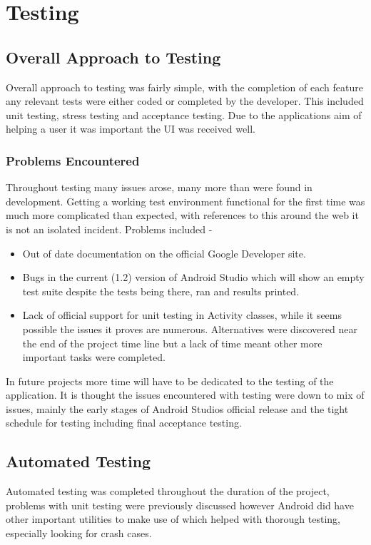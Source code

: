 \chapter{Testing}

\section{Overall Approach to Testing}
Overall approach to testing was fairly simple, with the completion of each feature any relevant tests were either coded or completed by the developer. This included unit testing, stress testing and acceptance testing. Due to the applications aim of helping a user it was important the UI was received well. 
\subsection{Problems Encountered}
Throughout testing many issues arose, many more than were found in development. Getting a working test environment functional for the first time was much more complicated than expected, with references to this around the web it is not an isolated incident. Problems included - 
\begin{itemize}
  \item Out of date documentation on the official Google Developer site.
  \item Bugs in the current (1.2) version of Android Studio which will show an empty test suite despite the tests being there, ran and results printed.
  \item Lack of official support for unit testing in Activity classes, while it seems possible the issues it proves are numerous. Alternatives were discovered near the end of the project time line but a lack of time meant other more important tasks were completed.  
\end{itemize}

In future projects more time will have to be dedicated to the testing of the application. It is thought the issues encountered with testing were down to mix of issues, mainly the early stages of Android Studios official release and the tight schedule for testing including final acceptance testing. 
\section{Automated Testing}
Automated testing was completed throughout the duration of the project, problems with unit testing were previously discussed however Android did have other important utilities to make use of which helped with thorough testing, especially looking for crash cases.
